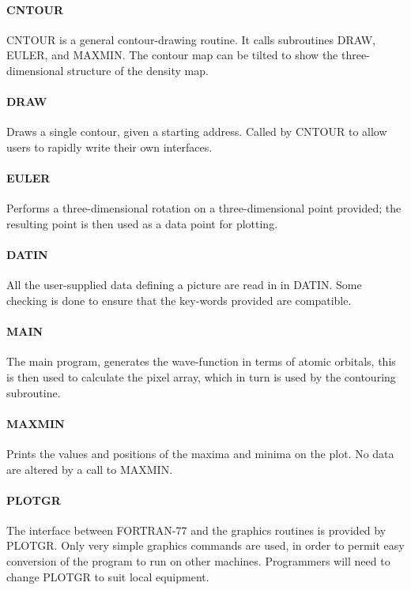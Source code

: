 \paragraph*{CNTOUR}
CNTOUR is a general contour-drawing routine. It calls subroutines
DRAW, EULER, and MAXMIN. The contour map can be tilted to show the
three-dimensional structure of the density map.

\paragraph*{DRAW}
 Draws a single contour, given a starting address. Called by CNTOUR
to allow users to rapidly write their own interfaces.

\paragraph*{EULER}
 Performs a three-dimensional rotation on a three-dimensional
point provided; the resulting point is then used as a data
point for plotting.

\paragraph*{DATIN}
 All the user-supplied data defining a picture are read in in DATIN.
Some checking is done to ensure that the key-words provided are
compatible.

\paragraph*{MAIN}
 The main program, generates the wave-function in terms of atomic
orbitals, this is then used to calculate the pixel array, which in
turn is used by the contouring subroutine.

\paragraph*{MAXMIN}
 Prints the values and positions of the maxima and minima on the plot.
No data are altered by a call to MAXMIN.

\paragraph*{PLOTGR}
 The interface between FORTRAN-77 and the graphics routines is provided
by PLOTGR. Only very simple graphics commands are used, in order to
permit easy conversion of the program to run on other machines.
Programmers will need to change PLOTGR to suit local equipment.

